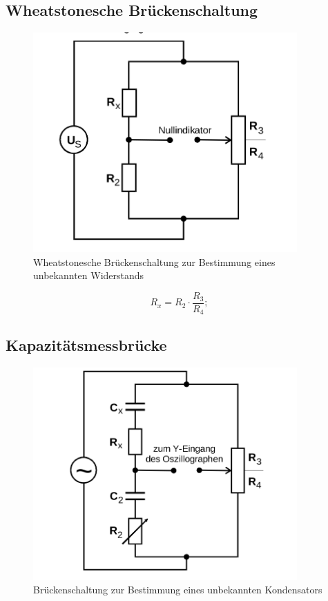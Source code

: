 \subsection{Wheatstonesche Brückenschaltung}
\begin{figure}
  \centering
  \includegraphics[width=0.9\textwidth]{Bilder/Wheatstone_bruecke.png}
  \caption{Wheatstonesche Brückenschaltung zur Bestimmung eines unbekannten Widerstands \cite{Anleitung}}
  \label{fig:wheatstonebrücke}
\end{figure}
\blindtext
\begin{equation}
  R_x=R_2 \cdot \frac{R_3}{R_4};
\label{eqn:widerstand}
\end{equation}
\subsection{Kapazitätsmessbrücke}
\begin{figure}
  \centering
  \includegraphics[width=0.9\textwidth]{Bilder/kapazitaetmessbruecke.png}
  \caption{Brückenschaltung zur Bestimmung eines unbekannten Kondensators \cite{Anleitung}}
  \label{fig:kapazitaetmessbrücke}
\end{figure}
\blindtext
